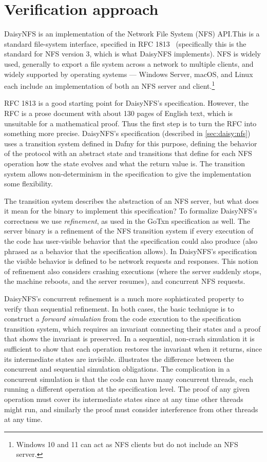 \section{Verification approach}%
\label{sec:daisy:motivation}

DaisyNFS is an implementation of the Network File System (NFS) API.\@ This is a
standard file-system interface, specified in RFC 1813~\cite{RFC:1813}
(specifically this is the standard for NFS version 3, which is what DaisyNFS
implements). NFS is widely used, generally to export a file system across a
network to multiple clients, and widely supported by operating systems ---
Windows Server, macOS, and Linux each include an implementation of both an NFS
server and client.\footnote{Windows 10 and 11 can act as NFS clients but do not
include an NFS server.}

RFC 1813 is a good starting point for DaisyNFS's specification.
However, the RFC is a prose document with about 130 pages of English text,
which is unsuitable for a mathematical proof. Thus the first step is
to turn the RFC into something more precise. DaisyNFS's specification (described in
\cref{sec:daisy:nfs}) uses a
transition system defined in Dafny for this purpose, defining the behavior of
the protocol with an abstract state and transitions that define
for each NFS operation how the state evolves and what the return value is. The
transition system allows non-determinism in the specification to give the
implementation some flexibility.

The transition system describes the abstraction of an NFS server, but what does
it mean for the  binary to implement this specification? To formalize
DaisyNFS's correctness we use \emph{refinement}, as used in the GoTxn
specification as well. The server binary is a refinement of the NFS transition
system if every execution of the code has
user-visible behavior that the specification could also produce (also phrased as
a behavior that the specification allows). In DaisyNFS's specification the visible
behavior is defined to be network requests and responses. This
notion of refinement also considers crashing executions (where the server
suddenly stops, the machine reboots, and the server resumes), and concurrent NFS
requests.

DaisyNFS's concurrent refinement is a much more sophisticated property to verify
than sequential refinement. In both cases, the basic technique is to construct a
\emph{forward simulation} from the code execution to the specification
transition system, which requires an invariant connecting their states and a
proof that shows the invariant is preserved. In a sequential, non-crash
simulation it is sufficient to show that each operation restores the invariant
when it returns, since its intermediate states are invisible.
 illustrates the difference between the
concurrent and sequential simulation obligations. The complication in a concurrent simulation is that the code can have many concurrent
threads, each running a different operation at the specification level. The
proof of any given operation must cover its intermediate states since at any
time other threads might run, and similarly the proof must consider interference
from other threads at any time.


